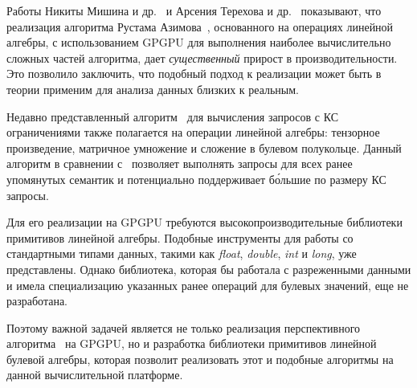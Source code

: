 Работы Никиты Мишина и др.~\cite{inproceedings:cfpq_matrix_evaluation} и Арсения Терехова и др.~\cite{inproceedings:cfqp_matrix_with_single_source} показывают, что реализация алгоритма Рустама Азимова~\cite{inproceedings:matrix_cfpq}, основанного на операциях линейной алгебры, с использованием GPGPU для выполнения наиболее вычислительно сложных частей алгоритма, дает \textit{существенный} прирост в производительности. Это позволило заключить, что подобный подход к реализации может быть в теории применим для анализа данных близких к реальным.

Недавно представленный алгоритм~\cite{inbook:kronecker_cfpq_adbis} для вычисления запросов с КС ограничениями также полагается на операции линейной алгебры: тензорное произведение, матричное умножение и сложение в булевом полукольце. Данный алгоритм в сравнении с~\cite{inproceedings:cfqp_matrix_with_single_source} позволяет выполнять запросы для всех ранее упомянутых семантик и потенциально поддерживает б\'ольшие по размеру КС запросы.

Для его реализации на GPGPU требуются высокопроизводительные библиотеки примитивов линейной алгебры. Подобные инструменты для работы со стандартными типами данных, такими как \textit{float}, \textit{double}, \textit{int} и \textit{long}, уже представлены. Однако библиотека, которая бы работала с разреженными данными и имела специализацию указанных ранее операций для булевых значений, еще не разработана. 

Поэтому важной задачей является не только реализация перспективного алгоритма~\cite{inbook:kronecker_cfpq_adbis} на GPGPU, но и разработка библиотеки примитивов линейной булевой алгебры, которая позволит реализовать этот и подобные алгоритмы на данной вычислительной платформе.
